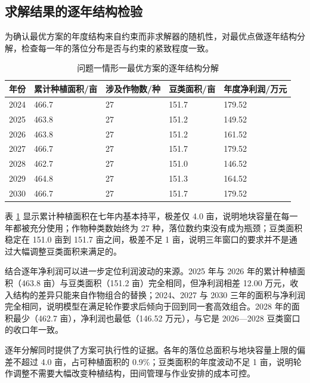 \documentclass[bwprint]{gmcmthesis}
\begin{document}
\subsection{求解结果的逐年结构检验}

为确认最优方案的年度结构来自约束而非求解器的随机性，对最优点做逐年结构分解，检查每一年的落位分布是否与约束的紧致程度一致。

\begin{table}[htbp]
\centering
\renewcommand\arraystretch{1.2}
\begin{tabular}{|p{1.6cm}|p{2.6cm}|p{2.4cm}|p{2.6cm}|p{2.6cm}|}
  \hline
  年份  &  累计种植面积/亩  &  涉及作物数/种  &  豆类面积/亩  &  年度净利润/万元 \\
  \hline
  2024  &  466.7  &  27  &  151.7  &  179.52 \\
  \hline
  2025  &  463.8  &  27  &  151.2  &  149.52 \\
  \hline
  2026  &  463.8  &  27  &  151.2  &  161.52 \\
  \hline
  2027  &  466.7  &  27  &  151.7  &  179.52 \\
  \hline
  2028  &  462.7  &  27  &  151.0  &  146.52 \\
  \hline
  2029  &  464.8  &  27  &  151.3  &  164.52 \\
  \hline
  2030  &  466.7  &  27  &  151.7  &  179.52 \\
  \hline
\end{tabular}
\caption{问题一情形一最优方案的逐年结构分解}
\label{tab:yearly}
\end{table}

表 \ref{tab:yearly} 显示累计种植面积在七年内基本持平，极差仅 4.0 亩，说明地块容量在每一年都被充分使用；作物种类数始终为 27 种，落位数约束没有成为瓶颈；豆类面积稳定在 151.0 亩到 151.7 亩之间，极差不足 1 亩，说明三年窗口的要求并不是通过大幅调整豆类面积来满足的。

结合逐年净利润可以进一步定位利润波动的来源。2025 年与 2026 年的累计种植面积（463.8 亩）与豆类面积（151.2 亩）完全相同，但净利润相差 12.00 万元，收入结构的差异只能来自作物组合的替换；2024、2027 与 2030 三年的面积与净利润完全相同，说明模型在满足轮作要求后倾向于回到同一套高效组合。2028 年的面积最少（462.7 亩），净利润也最低（146.52 万元），与它是 2026—2028 豆类窗口的收口年一致。

逐年分解同时提供了方案可执行性的证据。各年的落位总面积与地块容量上限的偏差不超过 4.0 亩，占可种植面积的 0.9\%；豆类面积的年度波动不足 1 亩，说明轮作调整不需要大幅改变种植结构，田间管理与作业安排的成本可控。
\end{document}
